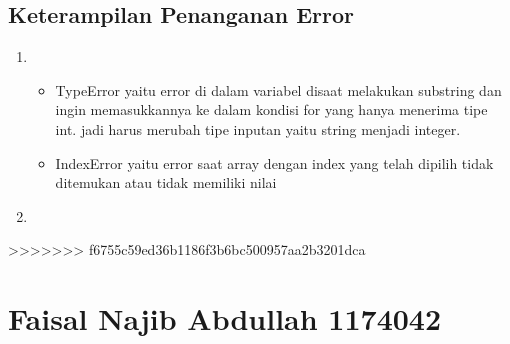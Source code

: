 \subsection{Keterampilan Penanganan Error}
\begin{enumerate}
	\item \begin{itemize} 
		\item TypeError yaitu error di dalam variabel disaat melakukan substring dan ingin memasukkannya ke dalam kondisi for 
	yang hanya menerima tipe int. jadi harus merubah tipe inputan yaitu string menjadi integer.
		\item IndexError yaitu error saat array dengan index yang telah dipilih tidak ditemukan atau tidak memiliki nilai
		\end{itemize}

	\item 
\end{enumerate}
>>>>>>> f6755c59ed36b1186f3b6bc500957aa2b3201dca

\section{Faisal Najib Abdullah 1174042}
